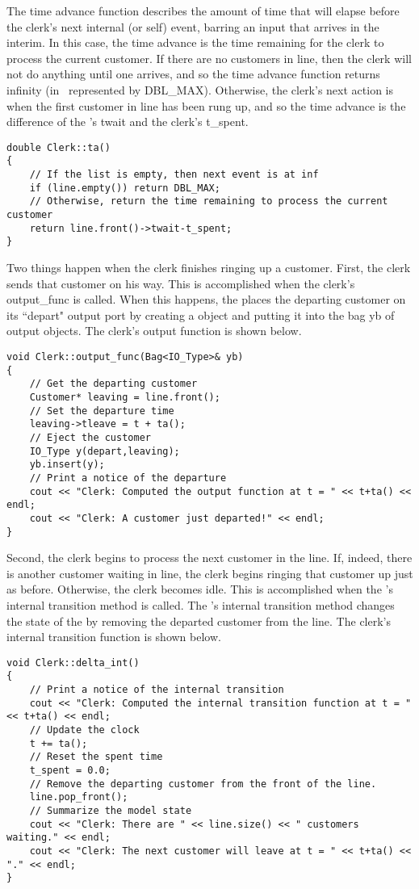 The time advance function describes the amount of time that will elapse before the clerk's next internal (or self) event, barring an input that arrives in the interim. In this case, the time advance is the time remaining for the clerk to process the current customer. If there are no customers in line, then the clerk will not do anything until one arrives, and so the time advance function returns infinity (in \adevs\ represented by DBL\_MAX). Otherwise, the clerk's next action is when the first customer in line has been rung up, and so the time advance is the difference of the 's twait and the clerk's t\_spent.

\begin{verbatim}
double Clerk::ta()
{
    // If the list is empty, then next event is at inf
    if (line.empty()) return DBL_MAX;
    // Otherwise, return the time remaining to process the current customer
    return line.front()->twait-t_spent;
}
\end{verbatim}

Two things happen when the clerk finishes ringing up a customer. First, the clerk sends that customer on his way. This is accomplished when the clerk's output\_func is called. When this happens, the  places the departing customer on its ``depart" output port by creating a  object and putting it into the bag yb of output objects. The clerk's output function is shown below.
\begin{verbatim}
void Clerk::output_func(Bag<IO_Type>& yb)
{
    // Get the departing customer
    Customer* leaving = line.front();
    // Set the departure time
    leaving->tleave = t + ta();
    // Eject the customer 
    IO_Type y(depart,leaving);
    yb.insert(y);
    // Print a notice of the departure
    cout << "Clerk: Computed the output function at t = " << t+ta() << endl;
    cout << "Clerk: A customer just departed!" << endl;
}
\end{verbatim}

Second, the clerk begins to process the next customer in the line. If, indeed, there is another customer waiting in line, the clerk begins ringing that customer up just as before. Otherwise, the clerk becomes idle. This is accomplished when the 's internal transition method is called. The 's internal transition method changes the state of the  by removing the departed customer from the line. The clerk's internal transition function is shown below.
\begin{verbatim}
void Clerk::delta_int()
{
    // Print a notice of the internal transition
    cout << "Clerk: Computed the internal transition function at t = " << t+ta() << endl;
    // Update the clock
    t += ta();
    // Reset the spent time 
    t_spent = 0.0;
    // Remove the departing customer from the front of the line.
    line.pop_front();
    // Summarize the model state
    cout << "Clerk: There are " << line.size() << " customers waiting." << endl;
    cout << "Clerk: The next customer will leave at t = " << t+ta() << "." << endl;
}
\end{verbatim}

